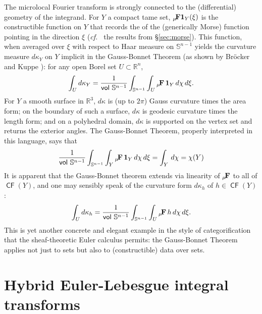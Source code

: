 \documentclass{psapm-l}
\theoremstyle{definition}
\theoremstyle{remark}
\numberwithin{equation}{section}
\begin{document}
The microlocal Fourier transform is strongly connected to the (differential) geometry of the integrand. For $Y$ a compact tame set, ${{\bf _\mu\! F}}{{\mathbf{1}}}_Y(\xi)$ is the constructible function on $Y$ that records the {{}} of the (generically Morse) function pointing in the direction $\xi$ ({{\em cf.~}} the results from \S\ref{sec:morse}). This function, when averaged over $\xi$ with respect to Haar measure on ${{\mathbb S}}^{n-1}$ yields the curvature measure $d\kappa_Y$ on $Y$ implicit in the Gauss-Bonnet Theorem (as shown by Br\"ocker and Kuppe \cite{BK}): for any open Borel set $U\subset{{\mathbb R}}^n$,
\[
    \int_U d\kappa_Y
    =
    \frac{1}{{{{\operatorname{\mathsf{{vol}}}}}}\ {{\mathbb S}}^{n-1}}
    \int_{{{\mathbb S}}^{n-1}}\int_U {{\bf _\mu\! F}}\,{{\mathbf{1}}}_Y
    \, d\chi \, d\xi
    .
\]
For $Y$ a smooth surface in ${{\mathbb R}}^3$, $d\kappa$ is (up to $2\pi$) Gauss curvature times the area form; on the boundary of such a surface, $d\kappa$ is geodesic curvature times the length form; and on a polyhedral domain, $d\kappa$ is supported on the vertex set and returns the exterior angles. The Gauss-Bonnet Theorem, properly interpreted in this language, says that
\begin{equation}
    \frac{1}{{{{\operatorname{\mathsf{{vol}}}}}}\ {{\mathbb S}}^{n-1}}
    \int_{{{\mathbb S}}^{n-1}}\int_Y {{\bf _\mu\! F}}\,{{\mathbf{1}}}_Y
    \, d\chi \, d\xi
    =
    \int_Y\,d\chi = \chi(Y)
\end{equation}
It is apparent that the Gauss-Bonnet theorem extends via linearity of ${{\bf _\mu\! F}}$ to all of ${{{\operatorname{\mathsf{{CF}}}}}}(Y)$, and one may sensibly speak of the curvature form $d\kappa_h$ of $h\in{{{\operatorname{\mathsf{{CF}}}}}}(Y)$:
\begin{equation}
    \int_U d\kappa_h
    =
    \frac{1}{{{{\operatorname{\mathsf{{vol}}}}}}\ {{\mathbb S}}^{n-1}}
    \int_{{{\mathbb S}}^{n-1}}\int_U {{\bf _\mu\! F}}\, h
    \, d\chi \, d\xi
    .
\end{equation}
This is yet another concrete and elegant example in the style of categorification that the sheaf-theoretic Euler calculus permits: the Gauss-Bonnet Theorem applies not just to sets but also to (constructible) data over sets.

\section{Hybrid Euler-Lebesgue integral transforms}
\label{sec:hybrid}
\end{document}
